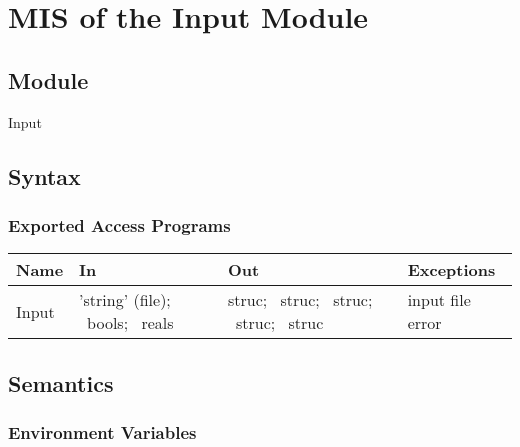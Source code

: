 \documentclass[12pt, titlepage]{article}
\begin{document}

\section{MIS of the Input Module} \label{sec:InputMod}

\subsection{Module}
Input

\subsection{Syntax}

\subsubsection{Exported Access Programs}
\begin{center}
\renewcommand*{\arraystretch}{1.5}
\begin{tabular}{| p{} | p{} | 
p{} | p{} |} \hline 

  \textbf{Name} & \textbf{In} & \textbf{Out} & \textbf{Exceptions}
  \\ \hline

   Input & 'string' (file); ~\newline bools; ~\newline reals & struc;
   ~\newline struc; ~\newline struc; ~\newline struc; ~\newline struc
   & input file error \\ \hline

\end{tabular}
\end{center}

\subsection{Semantics}

\subsubsection{Environment Variables}
\end{document}
